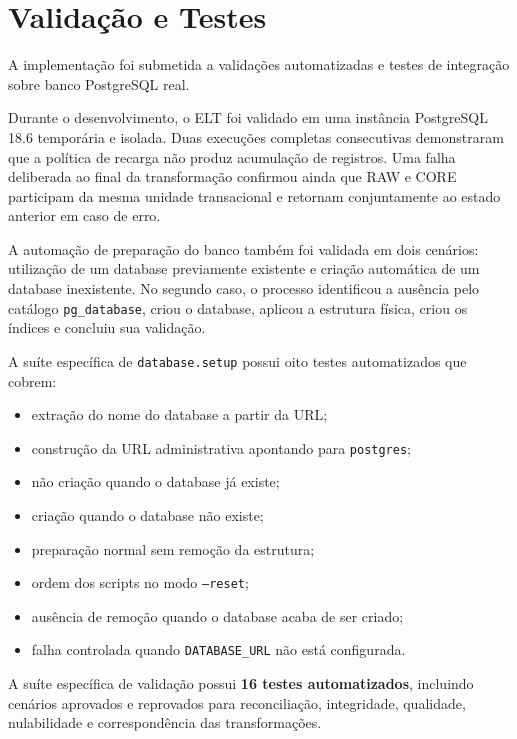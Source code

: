 \documentclass[12pt,a4paper]{article}
\begin{document}
	\section{Validação e Testes}
	
	A implementação foi submetida a validações automatizadas e testes de
	integração sobre banco PostgreSQL real.
	
	Durante o desenvolvimento, o ELT foi validado em uma instância PostgreSQL 18.6
	temporária e isolada. Duas execuções completas consecutivas demonstraram que a
	política de recarga não produz acumulação de registros. Uma falha deliberada ao
	final da transformação confirmou ainda que RAW e CORE participam da mesma
	unidade transacional e retornam conjuntamente ao estado anterior em caso de
	erro.
	
	A automação de preparação do banco também foi validada em dois cenários:
	utilização de um database previamente existente e criação automática de um
	database inexistente. No segundo caso, o processo identificou a ausência pelo
	catálogo \texttt{pg\_database}, criou o database, aplicou a estrutura física,
	criou os índices e concluiu sua validação.
	
	A suíte específica de \texttt{database.setup} possui oito testes automatizados
	que cobrem:
	
	\begin{itemize}[leftmargin=1.2cm]
		\item extração do nome do database a partir da URL;
		\item construção da URL administrativa apontando para \texttt{postgres};
		\item não criação quando o database já existe;
		\item criação quando o database não existe;
		\item preparação normal sem remoção da estrutura;
		\item ordem dos scripts no modo \texttt{--reset};
		\item ausência de remoção quando o database acaba de ser criado;
		\item falha controlada quando \texttt{DATABASE\_URL} não está configurada.
	\end{itemize}
	
	A suíte específica de validação possui \textbf{16 testes automatizados},
	incluindo cenários aprovados e reprovados para reconciliação, integridade,
	qualidade, nulabilidade e correspondência das transformações.
	
\end{document}
